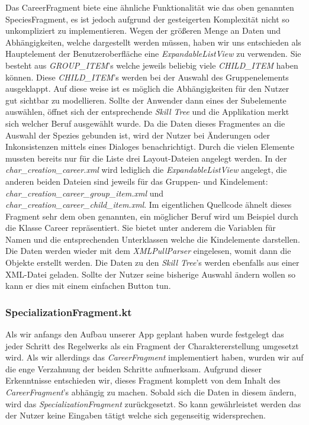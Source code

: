 Das CareerFragment biete eine ähnliche Funktionalität wie das oben genannten SpeciesFragment, es ist jedoch aufgrund der gesteigerten Komplexität nicht so unkompliziert zu implementieren. Wegen der größeren Menge an Daten und Abhängigkeiten, welche dargestellt werden müssen, haben wir uns entschieden als Hauptelement der Benutzeroberfläche eine \textit{ExpandableListView} zu verwenden. Sie besteht aus \textit{GROUP\_ITEM}'s welche jeweils beliebig viele \textit{CHILD\_ITEM} haben können. Diese \textit{CHILD\_ITEM}'s werden bei der Auswahl des Gruppenelements \grqq ausgeklappt\grqq{}. Auf diese weise ist es möglich die Abhängigkeiten für den Nutzer gut sichtbar zu modellieren. Sollte der Anwender dann eines der Subelemente auswählen, öffnet sich der entsprechende \textit{Skill Tree} und die Applikation merkt sich welcher Beruf ausgewählt wurde. Da die Daten dieses Fragmentes an die Auswahl der Spezies gebunden ist, wird der Nutzer bei Änderungen oder Inkonsistenzen mittels eines Dialoges benachrichtigt. Durch die vielen Elemente mussten bereits nur für die Liste drei Layout-Dateien angelegt werden. In der \textit{char\_creation\_career.xml} wird lediglich die \textit{ExpandableListView} angelegt, die anderen beiden Dateien sind jeweils für das Gruppen- und Kindelement: \textit{char\_creation\_career\_group\_item.xml} und \textit{char\_creation\_career\_child\_item.xml}. Im eigentlichen Quellcode ähnelt dieses Fragment sehr dem oben genannten, ein möglicher Beruf wird um Beispiel durch die Klasse Career repräsentiert. Sie bietet unter anderem die Variablen für Namen und die entsprechenden Unterklassen welche die Kindelemente darstellen. Die Daten werden wieder mit dem  \textit{XMLPullParser} eingelesen, womit dann die Objekte erstellt werden. Die Daten zu den \textit{Skill Tree}'s werden ebenfalls aus einer XML-Datei geladen. Sollte der Nutzer seine bisherige Auswahl ändern wollen so kann er dies mit einem einfachen Button tun.

\subsubsection{SpecializationFragment.kt}

Als wir anfangs den Aufbau unserer App geplant haben wurde festgelegt das jeder Schritt des Regelwerks als ein Fragment der Charaktererstellung umgesetzt wird. Als wir allerdings das \textit{CareerFragment} implementiert haben, wurden wir auf die enge Verzahnung der beiden Schritte aufmerksam. Aufgrund dieser Erkenntnisse entschieden wir, dieses Fragment komplett von dem Inhalt des \textit{CareerFragment}'s abhängig zu machen. Sobald sich die Daten in diesem ändern, wird das \textit{SpecializationFragment} zurückgesetzt. So kann gewährleistet werden das der Nutzer keine Eingaben tätigt welche sich gegenseitig widersprechen.

